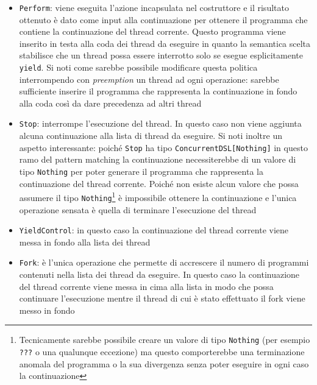 \begin{itemize}
  \item \lstinline{Perform}: viene eseguita l'azione incapsulata nel costruttore e il risultato ottenuto è dato come input alla continuazione per ottenere il programma che contiene la continuazione del thread corrente. Questo programma viene inserito in testa alla coda dei thread da eseguire in quanto la semantica scelta stabilisce che un thread possa essere interrotto solo se esegue esplicitamente \lstinline{yield}. Si noti come sarebbe possibile modificare questa politica interrompendo con \emph{preemption} un thread ad ogni operazione: sarebbe sufficiente inserire il programma che rappresenta la continuazione in fondo alla coda così da dare precedenza ad altri thread
  \item \lstinline{Stop}: interrompe l'esecuzione del thread. In questo caso non viene aggiunta alcuna continuazione alla lista di thread da eseguire. Si noti inoltre un aspetto interessante: poiché \lstinline{Stop} ha tipo \lstinline{ConcurrentDSL[Nothing]} in questo ramo del pattern matching la continuazione necessiterebbe di un valore di tipo \lstinline{Nothing} per poter generare il programma che rappresenta la continuazione del thread corrente. Poiché non esiste alcun valore che possa assumere il tipo \lstinline{Nothing}\footnote{Tecnicamente sarebbe possibile creare un valore di tipo \lstinline{Nothing} (per esempio \lstinline{???} o una qualunque eccezione) ma questo comporterebbe una terminazione anomala del programma o la sua divergenza senza poter eseguire in ogni caso la continuazione} è impossibile ottenere la continuazione e l'unica operazione sensata è quella di terminare l'esecuzione del thread
  \item \lstinline{YieldControl}: in questo caso la continuazione del thread corrente viene messa in fondo alla lista dei thread
  \item \lstinline{Fork}: è l'unica operazione che permette di accrescere il numero di programmi contenuti nella lista dei thread da eseguire. In questo caso la continuazione del thread corrente viene messa in cima alla lista in modo che possa continuare l'esecuzione mentre il thread di cui è stato effettuato il fork viene messo in fondo
\end{itemize}

